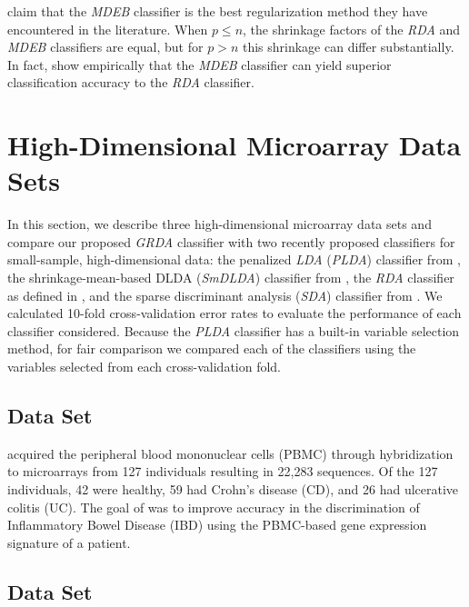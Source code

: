 \documentclass[11pt]{article}
\begin{document}
\cite{Srivastava:2007ww} claim that the \emph{MDEB} classifier is the best regularization method they have encountered in the literature. When $p \le n$, the shrinkage factors of the \emph{RDA} and \emph{MDEB} classifiers are equal, but for $p > n$ this shrinkage can differ substantially. In fact, \cite{Ramey:2011ji} show empirically that the \emph{MDEB} classifier can yield superior classification accuracy to the \emph{RDA} classifier.

\section{High-Dimensional Microarray Data Sets}

In this section, we describe three high-dimensional microarray data sets and compare our proposed \emph{GRDA} classifier with two recently proposed classifiers for small-sample, high-dimensional data: the penalized \emph{LDA} (\emph{PLDA}) classifier from \cite{Witten:2011kc}, the shrinkage-mean-based DLDA (\emph{SmDLDA}) classifier from \cite{Tong:2012hw}, the \emph{RDA} classifier as defined in \cite{Hastie:2008dt}, and the sparse discriminant analysis (\emph{SDA}) classifier from \cite{Clemmensen:2011kr}. We calculated 10-fold cross-validation error rates \citep{Hastie:2008dt} to evaluate the performance of each classifier considered. Because the \emph{PLDA} classifier has a built-in variable selection method, for fair comparison we compared each of the classifiers using the variables selected from each cross-validation fold.

\subsection{\cite{Burczynski:2006ik} Data Set}

\cite{Burczynski:2006ik} acquired the peripheral blood mononuclear cells (PBMC) through hybridization to microarrays from 127 individuals resulting in 22,283 sequences. Of the 127 individuals, 42 were healthy, 59 had Crohn's disease (CD), and 26 had ulcerative colitis (UC). The goal of \cite{Burczynski:2006ik} was to improve accuracy in the discrimination of Inflammatory Bowel Disease (IBD) using the PBMC-based gene expression signature of a patient.

\subsection{\cite{Nakayama:2007fl} Data Set}
\end{document}

